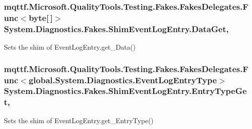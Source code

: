 \hypertarget{class_system_1_1_diagnostics_1_1_fakes_1_1_shim_event_log_entry_a48ea6138e9bb60c65b414efd8f1668c7}{
\subsubsection[{Data\-Get}]{\setlength{\rightskip}{0pt plus 5cm}mqttf.\-Microsoft.\-Quality\-Tools.\-Testing.\-Fakes.\-Fakes\-Delegates.\-Func$<$byte\mbox{[}$\,$\mbox{]}$>$ System.\-Diagnostics.\-Fakes.\-Shim\-Event\-Log\-Entry.\-Data\-Get\hspace{0.3cm}{\ttfamily [get]}, {\ttfamily [set]}}}\label{class_system_1_1_diagnostics_1_1_fakes_1_1_shim_event_log_entry_a48ea6138e9bb60c65b414efd8f1668c7}


Sets the shim of Event\-Log\-Entry.\-get\-\_\-\-Data()

\hypertarget{class_system_1_1_diagnostics_1_1_fakes_1_1_shim_event_log_entry_a3ae0dbb44f0e2bb8cd16af06303013c7}{
\subsubsection[{Entry\-Type\-Get}]{\setlength{\rightskip}{0pt plus 5cm}mqttf.\-Microsoft.\-Quality\-Tools.\-Testing.\-Fakes.\-Fakes\-Delegates.\-Func$<$global.\-System.\-Diagnostics.\-Event\-Log\-Entry\-Type$>$ System.\-Diagnostics.\-Fakes.\-Shim\-Event\-Log\-Entry.\-Entry\-Type\-Get\hspace{0.3cm}{\ttfamily [get]}, {\ttfamily [set]}}}\label{class_system_1_1_diagnostics_1_1_fakes_1_1_shim_event_log_entry_a3ae0dbb44f0e2bb8cd16af06303013c7}


Sets the shim of Event\-Log\-Entry.\-get\-\_\-\-Entry\-Type()

